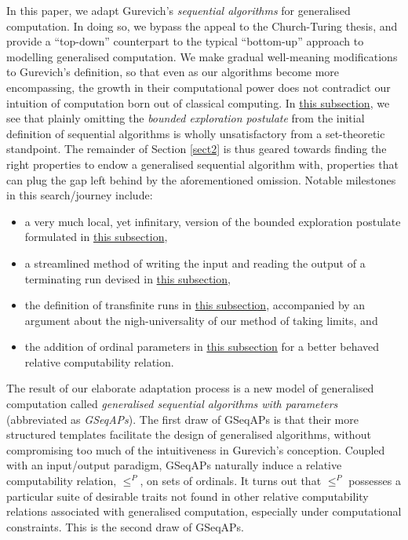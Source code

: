 \documentclass[12pt, twoside]{memoir}
\numberwithin{equation}{section}
\theoremstyle{definition}
\theoremstyle{remark}
\theoremstyle{definition}
\theoremstyle{definition}
\theoremstyle{definition}
\theoremstyle{remark}
\begin{document}
In this paper, we adapt Gurevich's \textit{sequential algorithms} for generalised computation. In doing so, we bypass the appeal to the Church-Turing thesis, and provide a ``top-down'' counterpart to the typical ``bottom-up'' approach to modelling generalised computation. We make gradual well-meaning modifications to Gurevich's definition, so that even as our algorithms become more encompassing, the growth in their computational power does not contradict our intuition of computation born out of classical computing. In \hyperref[ss210]{this subsection}, we see that plainly omitting the \textit{bounded exploration postulate} from the initial definition of sequential algorithms is wholly unsatisfactory from a set-theoretic standpoint. The remainder of Section \ref{sect2} is thus geared towards finding the right properties to endow a generalised sequential algorithm with, properties that can plug the gap left behind by the aforementioned omission. Notable milestones in this search/journey include:
\begin{itemize}
    \item a very much local, yet infinitary, version of the bounded exploration postulate formulated in \hyperref[ss240]{this subsection},
    \item a streamlined method of writing the input and reading the output of a terminating run devised in \hyperref[ss250]{this subsection},
    \item the definition of transfinite runs in \hyperref[ss270]{this subsection}, accompanied by an argument about the nigh-universality of our method of taking limits, and
    \item the addition of ordinal parameters in \hyperref[ss320]{this subsection} for a better behaved relative computability relation.
\end{itemize}

The result of our elaborate adaptation process is a new model of generalised computation called \textit{generalised sequential algorithms with parameters} (abbreviated as \textit{GSeqAPs}). The first draw of GSeqAPs is that their more structured templates facilitate the design of generalised algorithms, without compromising too much of the intuitiveness in Gurevich's conception. Coupled with an input/output paradigm, GSeqAPs naturally induce a relative computability relation, $\leq^P$, on sets of ordinals. It turns out that $\leq^P$ possesses a particular suite of desirable traits not found in other relative computability relations associated with generalised computation, especially under computational constraints. This is the second draw of GSeqAPs. 
\end{document}
